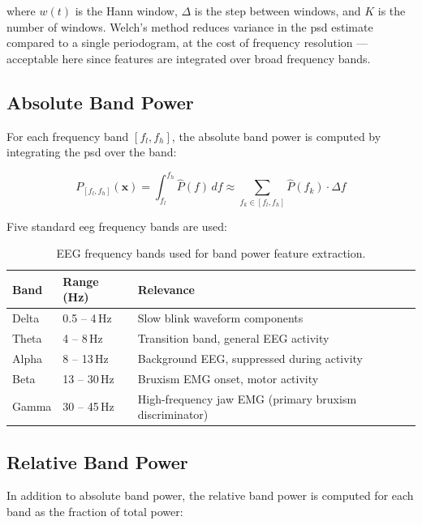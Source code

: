 \noindent where $w(t)$ is the Hann window, $\Delta$ is the
step between windows, and $K$ is the number of windows.
Welch's method reduces variance in the \acrshort{psd}
estimate compared to a single periodogram, at the cost of
frequency resolution — acceptable here since features are
integrated over broad frequency bands.

\subsection{Absolute Band Power}

For each frequency band $[f_l, f_h]$, the absolute band
power is computed by integrating the \acrshort{psd} over
the band:

\begin{equation}
P_{[f_l, f_h]}(\mathbf{x}) =
\int_{f_l}^{f_h} \hat{P}(f)\, df
\approx \sum_{f_k \in [f_l, f_h]} \hat{P}(f_k) \cdot \Delta f
\label{eq:bandpower}
\end{equation}

Five standard \acrshort{eeg} frequency bands are used:

\begin{table}[htbp]
\centering
\caption{EEG frequency bands used for band power feature
extraction.}
\label{tab:freq_bands}
\renewcommand{\arraystretch}{1.3}
\begin{tabular}{llp{5cm}}
\toprule
\textbf{Band} & \textbf{Range (Hz)} & \textbf{Relevance} \\
\midrule
Delta & 0.5 -- 4\,Hz  & Slow blink waveform components \\
Theta & 4 -- 8\,Hz    & Transition band, general EEG activity \\
Alpha & 8 -- 13\,Hz   & Background EEG, suppressed during activity \\
Beta  & 13 -- 30\,Hz  & Bruxism EMG onset, motor activity \\
Gamma & 30 -- 45\,Hz  & High-frequency jaw EMG (primary bruxism
                        discriminator) \\
\bottomrule
\end{tabular}
\end{table}

\subsection{Relative Band Power}

In addition to absolute band power, the relative band power
is computed for each band as the fraction of total power:

